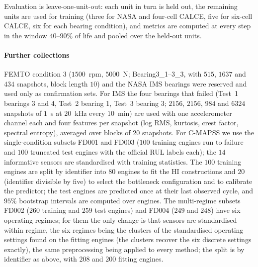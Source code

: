 \documentclass[preprint,12pt]{elsarticle}
\theoremstyle{definition}
\begin{document}
Evaluation is leave-one-unit-out: each unit in turn is held out, the remaining units are used for training (three for NASA and four-cell CALCE, five for six-cell CALCE, six for each bearing condition), and metrics are computed at every step in the window $40$--$90\%$ of life and pooled over the held-out units.


\paragraph{Further collections} FEMTO condition 3 ($1500$~rpm, $5000$~N; Bearing3\_1--3\_3, with $515$, $1637$ and $434$ snapshots, block length $10$) and the NASA IMS bearings were reserved and used only as confirmation sets. For IMS the four bearings that failed (Test~1 bearings 3 and 4, Test~2 bearing 1, Test~3 bearing 3; $2156$, $2156$, $984$ and $6324$ snapshots of $1$~s at $20$~kHz every $10$~min) are used with one accelerometer channel each and four features per snapshot (log RMS, kurtosis, crest factor, spectral entropy), averaged over blocks of $20$ snapshots. For C-MAPSS we use the single-condition subsets FD001 and FD003 ($100$ training engines run to failure and $100$ truncated test engines with the official RUL labels each); the $14$ informative sensors are standardised with training statistics. The $100$ training engines are split by identifier into $80$ engines to fit the HI constructions and $20$ (identifier divisible by five) to select the bottleneck configuration and to calibrate the predictor; the test engines are predicted once at their last observed cycle, and $95\%$ bootstrap intervals are computed over engines. The multi-regime subsets FD002 ($260$ training and $259$ test engines) and FD004 ($249$ and $248$) have six operating regimes; for them the only change is that sensors are standardised within regime, the six regimes being the clusters of the standardised operating settings found on the fitting engines (the clusters recover the six discrete settings exactly), the same preprocessing being applied to every method; the split is by identifier as above, with $208$ and $200$ fitting engines.
\end{document}

